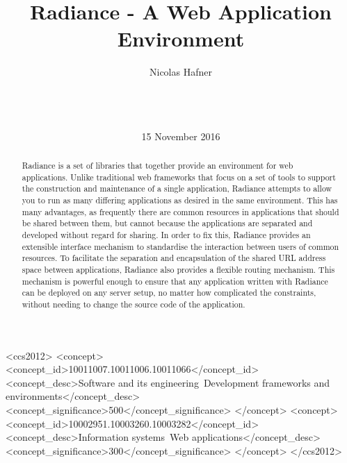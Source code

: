 \documentclass{sig-alternate}
\begin{document}
\doi{}
\isbn{}

\begin{CCSXML}
  <ccs2012>
  <concept>
  <concept_id>10011007.10011006.10011066</concept_id>
  <concept_desc>Software and its engineering~Development frameworks and environments</concept_desc>
  <concept_significance>500</concept_significance>
  </concept>
  <concept>
  <concept_id>10002951.10003260.10003282</concept_id>
  <concept_desc>Information systems~Web applications</concept_desc>
  <concept_significance>300</concept_significance>
  </concept>
  </ccs2012>
\end{CCSXML}


\title{Radiance - A Web Application Environment}

\author{
\alignauthor
Nicolas Hafner\\
       \\
       \\
       \\
}
\date{15 November 2016}

\maketitle

\begin{abstract}
  Radiance\cite{radiance} is a set of libraries that together provide an environment for web applications. Unlike traditional web frameworks that focus on a set of tools to support the construction and maintenance of a single application, Radiance attempts to allow you to run as many differing applications as desired in the same environment. This has many advantages, as frequently there are common resources in applications that should be shared between them, but cannot because the applications are separated and developed without regard for sharing. In order to fix this, Radiance provides an extensible interface mechanism to standardise the interaction between users of common resources. To facilitate the separation and encapsulation of the shared URL address space between applications, Radiance also provides a flexible routing mechanism. This mechanism is powerful enough to ensure that any application written with Radiance can be deployed on any server setup, no matter how complicated the constraints, without needing to change the source code of the application.
\end{abstract}
\end{document}
